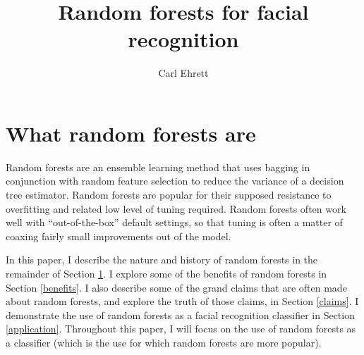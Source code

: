 \documentclass[10pt,a4paper]{article}
\title{Random forests for facial recognition}
\author{Carl Ehrett}
\begin{document}
\maketitle

\section{What random forests are}\label{intro}

Random forests are an ensemble learning method that uses bagging in conjunction with random feature selection to reduce the variance of a decision tree estimator. Random forests are popular for their supposed resistance to overfitting and related low level of tuning required. Random forests often work well with ``out-of-the-box'' default settings, so that tuning is often a matter of coaxing fairly small improvements out of the model.

In this paper, I describe the nature and history of random forests in the remainder of Section \ref{intro}. I explore some of the benefits of random forests in Section \ref{benefits}. I also describe some of the grand claims that are often made about random forests, and explore the truth of those claims, in Section \ref{claims}. I demonstrate the use of random forests as a facial recognition classifier in Section \ref{application}. Throughout this paper, I will focus on the use of random forests as a classifier (which is the use for which random forests are more popular).
\end{document}
